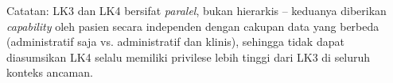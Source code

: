 Catatan: LK3 dan LK4 bersifat \textit{paralel}, bukan hierarkis -- keduanya diberikan \textit{capability} oleh pasien secara independen dengan cakupan data yang berbeda (administratif saja vs. administratif dan klinis), sehingga tidak dapat diasumsikan LK4 selalu memiliki privilese lebih tinggi dari LK3 di seluruh konteks ancaman.